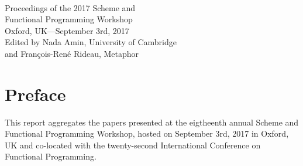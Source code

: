 \documentclass[oneside]{book}
\date{September 3rd, 2017}
\author{Nada Amin \and Fran\c{c}ois-Ren\'e Rideau}
\begin{document}
\frontmatter
\begin{titlepage}
\thispagestyle{empty}
\hspace{-15pt}%
\colorbox{neured}{%
\begin{minipage}[t][130pt][t]{0.99\textwidth}%
\hspace{30pt}%
\begin{minipage}[t][130pt][t]{0.16\textwidth}%
\vspace{\fill}%
\vspace{\fill}%
\end{minipage}%
\begin{minipage}[t][130pt][t]{0.70\textwidth}%
\vspace{\fill}%
\\
%
\vspace{30pt}%
\end{minipage}%
\end{minipage}}
\vspace{30pt}
\begin{flushright}
\Huge{Proceedings of the 2017 Scheme and\\ Functional Programming Workshop}\\
\vspace{20pt}
\large{Oxford, UK---September 3rd, 2017}\\
\vspace{20pt}
\large{Edited by Nada Amin, University of Cambridge\\ and Fran\c{c}ois-Ren\'e Rideau, Metaphor}
\end{flushright}
\vspace{\fill}
\colorbox{neugrey}{%
\begin{minipage}[t][24pt][t]{0.99\textwidth}
\hspace{30pt}
\end{minipage}}
\end{titlepage}
\restoregeometry
{}
\chapter*{Preface}
This report aggregates the papers presented at the eigtheenth annual Scheme and
Functional Programming Workshop, hosted on September 3rd, 2017 in Oxford,
UK and co-located with the twenty-second International
Conference on Functional Programming.
\end{document}
